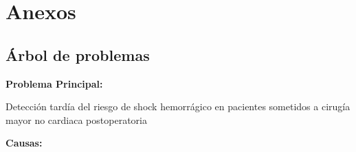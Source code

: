 \section*{Anexos}

\subsection*{Árbol de problemas}

\textbf{Problema Principal:}

\vspace{0.3cm}
Detección tardía del riesgo de shock hemorrágico en pacientes sometidos a cirugía mayor no cardiaca postoperatoria

\vspace{0.5cm}
\textbf{Causas:}

